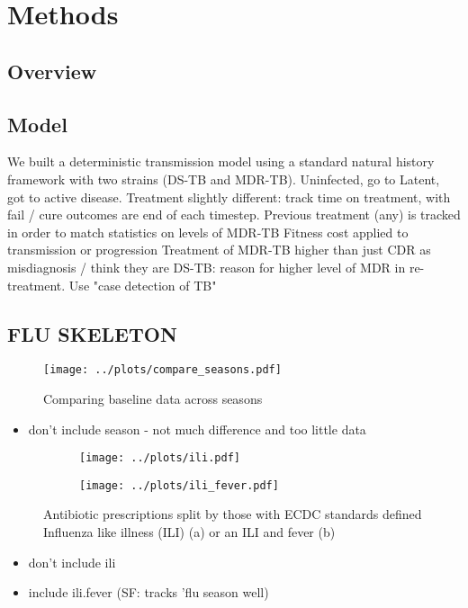 \documentclass{article}
\begin{document}
\clearpage

\section{Methods}

\subsection{Overview}

\subsection{Model}

We built a deterministic transmission model using a standard natural history framework with two strains (DS-TB and MDR-TB). 
Uninfected, go to Latent, got to active disease. 
Treatment slightly different: track time on treatment, with fail / cure outcomes are end of each timestep. 
Previous treatment (any) is tracked in order to match statistics on levels of MDR-TB
Fitness cost applied to transmission or progression
Treatment of MDR-TB higher than just CDR as misdiagnosis / think they are DS-TB: reason for higher level of MDR in re-treatment. Use "case detection of TB" 













\clearpage 

\subsection{FLU SKELETON}


\begin{figure}[htbp]
	\centering
	\texttt{[image: ../plots/compare\_seasons.pdf]}
	\caption{Comparing baseline data across seasons}
	\label{fig:compareseasons}
\end{figure} 

\begin{itemize}
\item don't include season - not much difference and too little data
\end{itemize}


\begin{figure}[htbp]
\centering
\begin{subfigure}[b]{0.4\textwidth}
		\texttt{[image: ../plots/ili.pdf]}
		\caption{}
		\label{fig:ili}
\end{subfigure}
\begin{subfigure}[b]{0.4\textwidth}
    \texttt{[image: ../plots/ili\_fever.pdf]}
	\caption{}
	\label{fig:ili.fever}
\end{subfigure}
\caption{Antibiotic prescriptions split by those with ECDC standards defined Influenza like illness (ILI) (a) or an ILI and fever (b)}
\label{fig:ilif}
\end{figure}

\begin{itemize}
\item don't include ili
\item include ili.fever (SF: tracks 'flu season well)
\end{itemize}




% 
\end{document}
